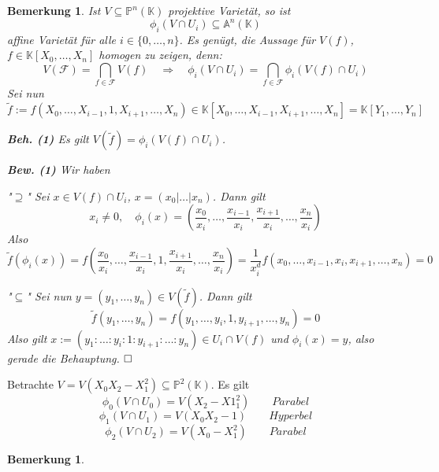 \documentclass[11pt]{book}
\newtheorem{remark}[theorem]{Bemerkung}
\theoremstyle{nonumberbreak}
\newenvironment{pr}[1][]{\ifthenelse{\equal{#1}{}}{\proof}{\proof[#1]}\rm}{\endproof}
\newenvironment{ex}[1][]{\ifthenelse{\equal{#1}{}}{\example}{\example[#1]}\rm}{\endexample}
\begin{document}
\begin{spacing}{1.3}
\begin{remark}
Ist $V \subseteq \mathbb{P}^n(\mathbb{K})$ projektive Varietät, so ist 
$$\phi_i(V \cap U_i) \subseteq \mathbb{A}^n(\mathbb{K})$$
affine Varietät für alle $i \in \{0, \ldots, n \}$.
\begin{pr}
Es genügt, die Aussage für $V(f)$, $f \in \mathbb{K}[X_0, \ldots, X_n]$ homogen zu zeigen, denn:
$$V(\mathcal{F})= \bigcap_{f\in \mathcal{F}}V(f) \quad\Longrightarrow \quad \phi_i(V \cap U_i) = \bigcap_{f \in \mathcal{F}} \phi_i(V(f) \cap U_i)$$
Sei nun $$\tilde{f}:=f(X_0, \ldots, X_{i-1}, 1, X_{i+1}, \ldots, X_n) \in \mathbb{K}[X_0, \ldots, X_{i-1}, X_{i+1}, \ldots, X_n] =\mathbb{K}[Y_1, \ldots, Y_n]$$
\begin{compactenum}
\item[\textbf{Beh. (1)}] Es gilt $V(\tilde{f})=\phi_i(V(f) \cap U_i)$.
\item[\textbf{Bew. (1)}]
Wir haben
\begin{compactenum}
\item["$\supseteq$"] Sei $x \in V(f)\cap U_i$, $x=(x_0 \vert \ldots \vert x_n)$. Dann gilt
$$x_i \neq 0, \quad \phi_i(x) = \left(\frac{x_0}{x_i}, \ldots, \frac{x_{i-1}}{x_i}, \frac{x_{i+1}}{x_i}, \ldots, \frac{x_n}{x_i} \right)$$
Also
$$\tilde{f}(\phi_i(x)) = f \left(\frac{x_0}{x_i}, \ldots, \frac{x_{i-1}}{x_i}, 1 , \frac{x_{i+1}}{x_i}, \ldots, \frac{x_n}{x_i} \right) = \frac{1}{x_i^d} f(x_0, \ldots, x_{i-1}, x_i, x_{i+1}, \ldots, x_n) =0$$
\item["$\subseteq$"] Sei nun $y=(y_1, \ldots, y_n) \in V(\tilde{f})$. Dann gilt
$$\tilde{f}(y_1, \ldots, y_n) = f(y_1, \ldots, y_i, 1, y_{i+1}, \ldots, y_n) = 0$$
Also gilt $x:=(y_1: \ldots :y_i : 1 :y_{i+1}: \ldots :y_n) \in U_i \cap V(f)$ und $\phi_i(x)=y$, also gerade die Behauptung. $\hfill \Box$
\end{compactenum}
\end{compactenum}
\end{pr}
\end{remark}

\begin{ex}

Betrachte $V=V(X_0X_2 - X_1^2) \subseteq \mathbb{P}^2(\mathbb{K})$.
Es gilt
$$\phi_0(V \cap U_0) = V(X_2 - X1_1^2) \qquad \textit{Parabel}$$
$$\phi_1(V \cap U_1) = V(X_0X_2-1) \qquad \textit{Hyperbel}$$
$$\phi_2(V \cap U_2) = V(X_0 - X_1^2) \qquad \textit{Parabel}$$
\end{ex}

\begin{remark}  %


\end{remark}
\end{spacing}
\end{document}
